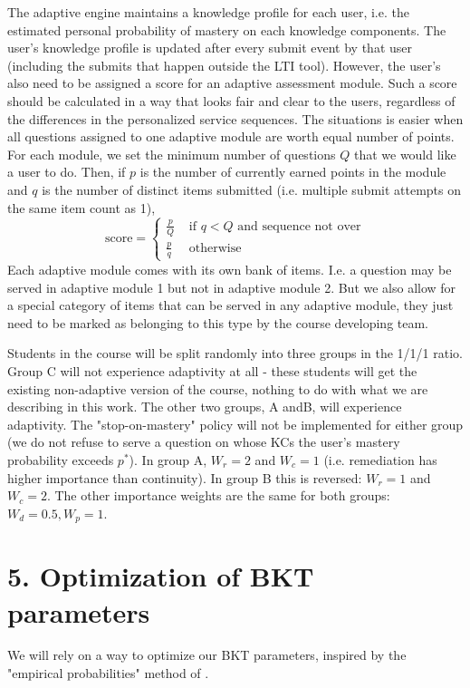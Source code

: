 \documentclass{sigchi}
\newcommand{\1}{\mathbf{1}}
\newcommand{\be}{\begin{equation}}
\newcommand{\ee}{\end{equation}}
\begin{document}
The adaptive engine maintains a knowledge profile for each user, i.e. the estimated personal probability of mastery on each knowledge components. The user's knowledge profile is updated after every submit event by that user (including the submits that happen outside the LTI tool). However, the user's also need to be assigned a score for an adaptive assessment module. Such a score should be calculated in a way that looks fair and clear to the users, regardless of the differences in the personalized service sequences. The situations is easier when all questions assigned to one adaptive module are worth equal number of points. For each module, we set the minimum number of questions $Q$ that we would like a user to do. Then, if $p$ is the number of currently earned points in the module and $q$ is the number of distinct items submitted (i.e. multiple submit attempts on the same item count as 1),
\be \textrm{score}=\left\{
\begin{matrix}
\frac{p}{Q} & \textrm{ if }q<Q\textrm{ and sequence not over}\\
\frac{p}{q} & \textrm{ otherwise}
\end{matrix}
\right.
\ee
Each adaptive module comes with its own bank of items. I.e. a question may be served in adaptive module 1 but not in adaptive module 2. But we also allow for a special category of items that can be served in any adaptive module, they just need to be marked as belonging to this type by the course developing team.

Students in the course will be split randomly into three groups in the 1/1/1 ratio. Group C will not experience adaptivity at all - these students will get the existing non-adaptive version of the course, nothing to do with what we are describing in this work. The other two groups, A andB, will experience adaptivity. The "stop-on-mastery" policy will not be implemented for either group (we do not refuse to serve a question on whose KCs the user's mastery probability exceeds $p^*$). In group A, $W_r=2$ and $W_c=1$ (i.e. remediation has higher importance than continuity). In group B this is reversed: $W_r=1$ and $W_c=2$. The other importance weights are the same for both groups: $W_d=0.5, W_p=1$. 


\section{5. Optimization of BKT parameters}
\label{sec:optimization}
We will rely on a way to optimize our BKT parameters, inspired by the "empirical probabilities" method of \cite{hawkins2014learning}.
\end{document}
